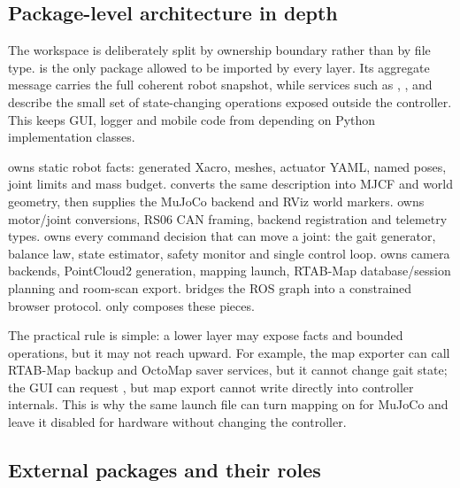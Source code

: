 \documentclass[11pt,a4paper]{article}
\begin{document}
\subsection{Package-level architecture in depth}

The workspace is deliberately split by ownership boundary rather than by file
type.  is the only package allowed to be imported by every
layer. Its aggregate  message carries the full coherent robot
snapshot, while services such as , ,
 and  describe the small set of state-changing
operations exposed outside the controller. This keeps GUI, logger and mobile
code from depending on Python implementation classes.

 owns static robot facts: generated Xacro, meshes,
actuator YAML, named poses, joint limits and mass budget. 
converts the same description into MJCF and world geometry, then supplies the
MuJoCo backend and RViz world markers.  owns
motor/joint conversions, RS06 CAN framing, backend registration and telemetry
types.  owns every command decision that can move a
joint: the gait generator, balance law, state estimator, safety monitor and
single control loop.  owns camera backends,
PointCloud2 generation, mapping launch, RTAB-Map database/session planning and
room-scan export.  bridges the ROS graph into a constrained
browser protocol.  only composes these pieces.

The practical rule is simple: a lower layer may expose facts and bounded
operations, but it may not reach upward. For example, the map exporter can call
RTAB-Map backup and OctoMap saver services, but it cannot change gait state;
the GUI can request , but map export cannot
write directly into controller internals. This is why the same launch file can
turn mapping on for MuJoCo and leave it disabled for hardware without changing
the controller.

\subsection{External packages and their roles}
\end{document}
